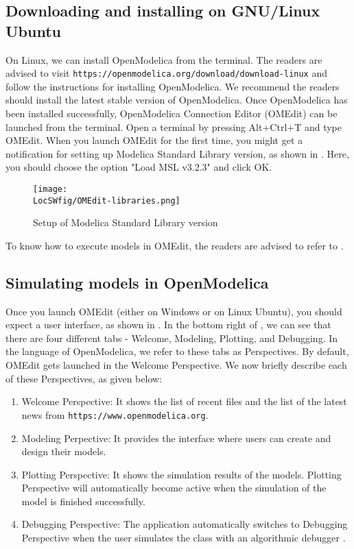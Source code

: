 \subsection{Downloading and installing on GNU/Linux Ubuntu} \label{openmodelica-install-linux}
On Linux, we can install OpenModelica from the terminal. The readers are advised to visit 
{\tt https://openmodelica.org/download/download-linux} and follow the instructions for installing OpenModelica.
We recommend the readers should install the latest stable version of OpenModelica. 
Once OpenModelica has been installed successfully, OpenModelica Connection Editor (OMEdit) can be launched
from the terminal. Open a terminal by pressing Alt+Ctrl+T and type OMEdit. When you 
launch OMEdit for the first time, you might get a notification for setting up 
Modelica Standard Library version, as shown in . Here, you 
should choose the option "Load MSL v3.2.3" and click OK.  
\begin{figure}
      \centering
      \texttt{[image: \\LocSWfig/OMEdit-libraries.png]}
      \caption{Setup of Modelica Standard Library version}
      \label{om-help}
\end{figure}
To know how to execute models in OMEdit, the readers are advised to refer to . 

\subsection{Simulating models in OpenModelica}\label{OpenModelica-code-execution}
Once you launch OMEdit (either on Windows or on Linux Ubuntu), you should expect a user interface, 
as shown in . In the bottom right of , we can 
see that there are four different tabs - Welcome, Modeling, Plotting, and 
Debugging. In the language of OpenModelica, we refer to these tabs as Perspectives. 
By default, OMEdit gets launched in the Welcome Perspective. We now briefly describe each 
of these Perspectives, as given below:
\begin{enumerate}
      \item Welcome Perspective: It shows the list of recent files and the list of the 
      latest news from {\tt https://www.openmodelica.org}.
      \item Modeling Perpective: It provides the interface where users can 
      create and design their models.
      \item Plotting Perspective: It shows the simulation results of the models. 
      Plotting Perspective will automatically become active 
      when the simulation of the model is finished successfully.
      \item Debugging Perspective: The application automatically switches to Debugging Perspective 
      when the user simulates the class with an algorithmic debugger \cite{om-ref}.
\end{enumerate}


